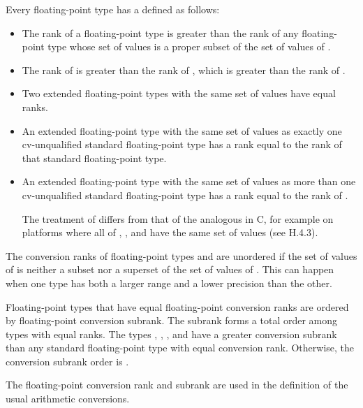 \pnum
Every floating-point type has a 
defined as follows:
\begin{itemize}
\item
The rank of a floating-point type  is greater than
the rank of any floating-point type
whose set of values is a proper subset of the set of values of .
\item
The rank of  is greater than
the rank of ,
which is greater than the rank of .
\item
Two extended floating-point types with the same set of values have equal ranks.
\item
An extended floating-point type with the same set of values as
exactly one cv-unqualified standard floating-point type
has a rank equal to the rank of that standard floating-point type.
\item
An extended floating-point type with the same set of values as
more than one cv-unqualified standard floating-point type
has a rank equal to the rank of .
\begin{tailnote}
The treatment of  differs from
that of the analogous  in C,
for example on platforms where all of
,
, and
have the same set of values (see \IsoC{} H.4.3).
\end{tailnote}
\end{itemize}
\begin{note}
The conversion ranks of floating-point types  and 
are unordered if the set of values of  is
neither a subset nor a superset of the set of values of .
This can happen when one type has both a larger range and a lower precision
than the other.
\end{note}

\pnum
Floating-point types that have equal floating-point conversion ranks
are ordered by floating-point conversion subrank.
The subrank forms a total order among types with equal ranks.
The types
,
,
, and
have a greater conversion subrank than any standard floating-point type
with equal conversion rank.
Otherwise, the conversion subrank order is
.

\pnum
\begin{note}
The floating-point conversion rank and subrank are used in
the definition of the usual arithmetic conversions.
\end{note}

